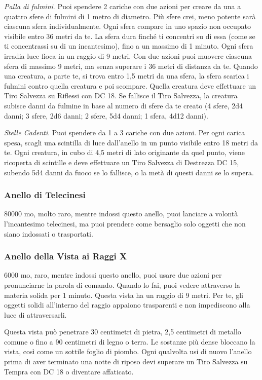 \begin{multicols}{2}
\textit{Palla di fulmini}. Puoi spendere 2 cariche con due azioni per creare da una a quattro sfere di fulmini di 1 metro di diametro. Più sfere crei, meno potente sarà ciascuna sfera individualmente.
Ogni sfera compare in uno spazio non occupato visibile entro 36 metri da te. La sfera dura finché ti concentri su di essa (come se ti concentrassi su di un incantesimo), fino a un massimo di 1 minuto. Ogni sfera irradia luce fioca in un raggio di 9 metri. Con due azioni puoi muovere ciascuna sfera di massimo 9 metri, ma senza superare i 36 metri di distanza da te. Quando una creatura, a parte te, si trova entro 1,5 metri da una sfera, la sfera scarica i fulmini contro quella creatura e poi scompare. Quella creatura deve effettuare un Tiro Salvezza su Riflessi con DC 18. Se fallisce il Tiro Salvezza, la creatura subisce danni da fulmine in base al numero di sfere da te creato (4 sfere, 2d4 danni; 3 sfere, 2d6 danni; 2 sfere, 5d4 danni; 1 sfera, 4d12 danni).

\textit{Stelle Cadenti}. Puoi spendere da 1 a 3 cariche con due azioni. Per ogni carica spesa, scagli una scintilla di luce dall'anello in un punto visibile entro 18 metri da te. Ogni creatura, in cubo di 4,5 metri di lato originante da quel punto, viene ricoperta di scintille e deve effettuare un Tiro Salvezza di Destrezza DC 15, subendo 5d4 danni da fuoco se lo fallisce, o la metà di questi danni se lo supera.

\subsubsection*{Anello di Telecinesi}
80000 mo, molto raro, mentre indossi questo anello, puoi lanciare a volontà l'incantesimo telecinesi, ma puoi prendere come bersaglio solo oggetti che non siano indossati o trasportati.

\subsubsection*{Anello della Vista ai Raggi X}
6000 mo, raro, mentre indossi questo anello, puoi usare due azioni per pronunciarne la parola di comando. Quando lo fai, puoi vedere attraverso la materia solida per 1 minuto. Questa vista ha un raggio di 9 metri. Per te, gli oggetti solidi all'interno del raggio appaiono trasparenti e non impediscono alla luce di attraversarli.

Questa vista può penetrare 30 centimetri di pietra, 2,5 centimetri di metallo comune o fino a 90 centimetri di legno o terra. Le sostanze più dense bloccano la vista, così come un sottile foglio di piombo. Ogni qualvolta usi di nuovo l'anello prima di aver terminato una notte di riposo devi superare un Tiro Salvezza su Tempra con DC 18 o diventare affaticato.


\end{multicols}

